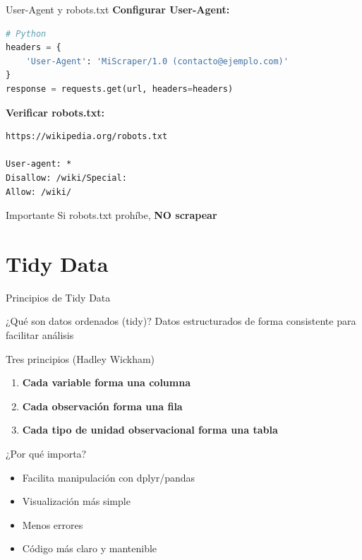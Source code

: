 \documentclass[aspectratio=169]{beamer}
\begin{document}
\begin{frame}[fragile]{User-Agent y robots.txt}
\textbf{Configurar User-Agent:}
\begin{lstlisting}[language=Python]
# Python
headers = {
    'User-Agent': 'MiScraper/1.0 (contacto@ejemplo.com)'
}
response = requests.get(url, headers=headers)
\end{lstlisting}

\vspace{0.5em}

\textbf{Verificar robots.txt:}
\begin{verbatim}
https://wikipedia.org/robots.txt

User-agent: *
Disallow: /wiki/Special:
Allow: /wiki/
\end{verbatim}

\begin{alertblock}{Importante}
Si robots.txt prohíbe, \textbf{NO scrapear}
\end{alertblock}
\end{frame}

\section{Tidy Data}

\begin{frame}{Principios de Tidy Data}
\begin{block}{¿Qué son datos ordenados (tidy)?}
Datos estructurados de forma consistente para facilitar análisis
\end{block}

\begin{block}{Tres principios (Hadley Wickham)}
\begin{enumerate}
    \item \textbf{Cada variable forma una columna}
    \item \textbf{Cada observación forma una fila}
    \item \textbf{Cada tipo de unidad observacional forma una tabla}
\end{enumerate}
\end{block}

\pause

\begin{alertblock}{¿Por qué importa?}
\begin{itemize}
    \item Facilita manipulación con dplyr/pandas
    \item Visualización más simple
    \item Menos errores
    \item Código más claro y mantenible
\end{itemize}
\end{alertblock}
\end{frame}
\end{document}
